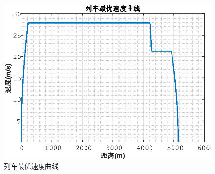 \documentclass[12pt,a4paper]{nmmcm}
\begin{document}
\begin{figure}[H]
\centering
\includegraphics{figures/zysd.eps}
\caption{列车最优速度曲线}\label{zuiyou}
\end{figure}
\end{document}

